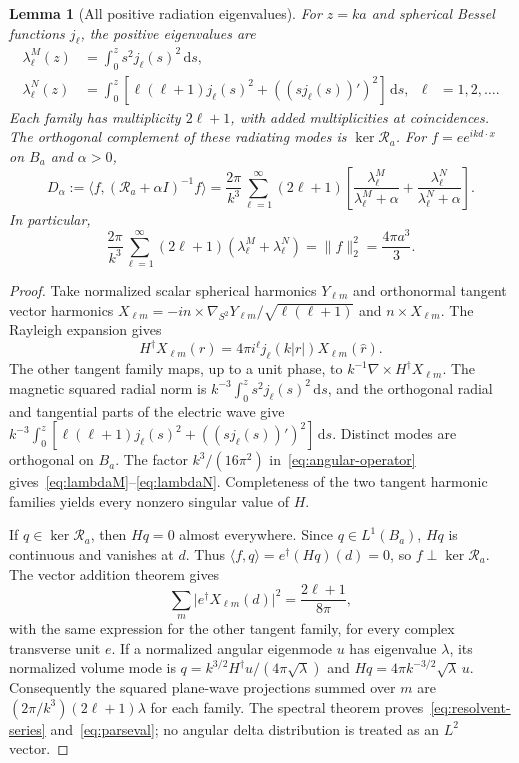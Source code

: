 \documentclass[11pt]{article}
\newtheorem{lemma}[theorem]{Lemma}
\newcommand{\dd}{\,\mathrm{d}}
\newcommand{\ip}[2]{\langle #1,#2\rangle}
\newcommand{\norm}[1]{\lVert #1\rVert}
\newcommand{\abs}[1]{\lvert #1\rvert}
\begin{document}
\begin{lemma}[All positive radiation eigenvalues]\label{lem:spectrum}
For $z=ka$ and spherical Bessel functions $j_\ell$, the positive eigenvalues are
\begin{align}
 \lambda^M_\ell(z)&=\int_0^zs^2j_\ell(s)^2\dd s,\label{eq:lambdaM}\\
 \lambda^N_\ell(z)&=\int_0^z\left[\ell(\ell+1)j_\ell(s)^2+
                                  ((sj_\ell(s))')^2\right]\dd s,
 &\ell&=1,2,\ldots.\label{eq:lambdaN}
\end{align}
Each family has multiplicity $2\ell+1$, with added multiplicities at coincidences. The orthogonal complement of these radiating modes is $\ker\mathcal R_a$. For $f=e e^{ikd\cdot x}$ on $B_a$ and $\alpha>0$,
\begin{equation}\label{eq:resolvent-series}
 D_\alpha:=\ip f{(\mathcal R_a+\alpha I)^{-1}f}
 =\frac{2\pi}{k^3}\sum_{\ell=1}^\infty(2\ell+1)
 \left[\frac{\lambda^M_\ell}{\lambda^M_\ell+\alpha}
       +\frac{\lambda^N_\ell}{\lambda^N_\ell+\alpha}\right].
\end{equation}
In particular,
\begin{equation}\label{eq:parseval}
 \frac{2\pi}{k^3}\sum_{\ell=1}^\infty(2\ell+1)(\lambda^M_\ell+\lambda^N_\ell)
 =\norm f_2^2=\frac{4\pi a^3}{3}.
\end{equation}
\end{lemma}
\begin{proof}
Take normalized scalar spherical harmonics $Y_{\ell m}$ and orthonormal tangent vector harmonics $X_{\ell m}=-in\times\nabla_{S^2}Y_{\ell m}/\sqrt{\ell(\ell+1)}$ and $n\times X_{\ell m}$. The Rayleigh expansion gives
\[
 H^\dagger X_{\ell m}(r)=4\pi i^\ell j_\ell(k\abs r)X_{\ell m}(\widehat r).
\]
The other tangent family maps, up to a unit phase, to $k^{-1}\nabla\times H^\dagger X_{\ell m}$. The magnetic squared radial norm is $k^{-3}\int_0^zs^2j_\ell(s)^2\dd s$, and the orthogonal radial and tangential parts of the electric wave give $k^{-3}\int_0^z[\ell(\ell+1)j_\ell(s)^2+((sj_\ell(s))')^2]\dd s$. Distinct modes are orthogonal on $B_a$. The factor $k^3/(16\pi^2)$ in~\eqref{eq:angular-operator} gives~\eqref{eq:lambdaM}--\eqref{eq:lambdaN}. Completeness of the two tangent harmonic families yields every nonzero singular value of $H$.

If $q\in\ker\mathcal R_a$, then $Hq=0$ almost everywhere. Since $q\in L^1(B_a)$, $Hq$ is continuous and vanishes at $d$. Thus $\ip f q=e^\dagger(Hq)(d)=0$, so $f\perp\ker\mathcal R_a$. The vector addition theorem gives
\[
 \sum_m\abs{e^\dagger X_{\ell m}(d)}^2=\frac{2\ell+1}{8\pi},
\]
with the same expression for the other tangent family, for every complex transverse unit $e$. If a normalized angular eigenmode $u$ has eigenvalue $\lambda$, its normalized volume mode is $q=k^{3/2}H^\dagger u/(4\pi\sqrt\lambda)$ and $Hq=4\pi k^{-3/2}\sqrt\lambda\,u$. Consequently the squared plane-wave projections summed over $m$ are $(2\pi/k^3)(2\ell+1)\lambda$ for each family. The spectral theorem proves~\eqref{eq:resolvent-series} and~\eqref{eq:parseval}; no angular delta distribution is treated as an $L^2$ vector.
\end{proof}
\end{document}
